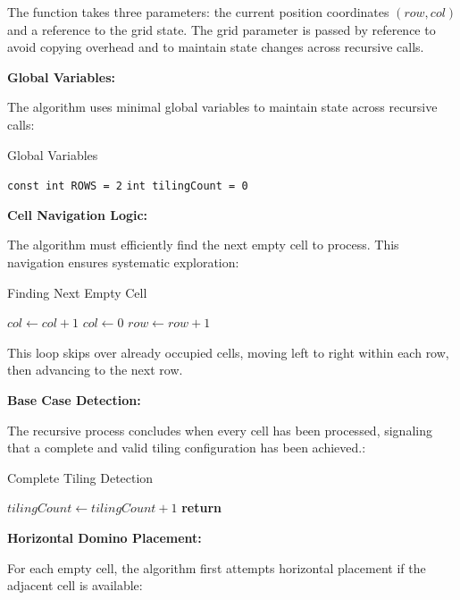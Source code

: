 \documentclass[conference]{IEEEtran}
\begin{document}
The function takes three parameters: the current position coordinates $(row, col)$ and a reference to the grid state. The grid parameter is passed by reference to avoid copying overhead and to maintain state changes across recursive calls.

\textbf{Global Variables:}

The algorithm uses minimal global variables to maintain state across recursive calls:

\begin{algorithm}[htbp]
\caption{Global Variables}
\begin{algorithmic}[1]
\State \texttt{const int ROWS = 2} 
\State \texttt{int tilingCount = 0} 
\end{algorithmic}
\end{algorithm}

\textbf{Cell Navigation Logic:}

The algorithm must efficiently find the next empty cell to process. This navigation ensures systematic exploration:

\begin{algorithm}[htbp]
\caption{Finding Next Empty Cell}
\begin{algorithmic}[1]
    \State $col \gets col + 1$
        \State $col \gets 0$
        \State $row \gets row + 1$
    \EndIf
\EndWhile
\end{algorithmic}
\end{algorithm}

This loop skips over already occupied cells, moving left to right within each row, then advancing to the next row.

\textbf{Base Case Detection:}

The recursive process concludes when every cell has been processed, signaling that a complete and valid tiling configuration has been achieved.:

\begin{algorithm}[htbp]
\caption{Complete Tiling Detection}
\begin{algorithmic}[1]
    \State $tilingCount \gets tilingCount + 1$
    \State \textbf{return}
\EndIf
\end{algorithmic}
\end{algorithm}

\textbf{Horizontal Domino Placement:}

For each empty cell, the algorithm first attempts horizontal placement if the adjacent cell is available:
\end{document}
